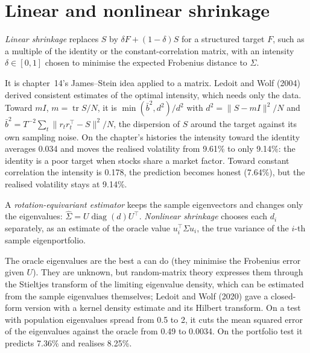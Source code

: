 \section{Linear and nonlinear shrinkage}

\begin{definition}\label{def:qm:covariance-estimation-and-random-matrices:linear}
\emph{Linear shrinkage} replaces $S$ by $\delta F + (1 - \delta)S$ for a structured target $F$, such as a multiple of the identity or the constant-correlation
matrix, with an intensity $\delta \in [0, 1]$ chosen to minimise the expected Frobenius distance to $\Sigma$.
\end{definition}

It is chapter~14's James--Stein idea applied to a matrix. Ledoit and Wolf (2004) derived consistent estimates of the optimal intensity, which needs only the data. Toward
$mI$, $m = \operatorname{tr}S/N$, it is $\min(\bar b^2, d^2)/d^2$ with $d^2 = \lVert S - mI\rVert^2/N$ and $\bar b^2 = T^{-2}\sum_t\lVert r_tr_t^\top - S\rVert^2/N$, the dispersion of $S$ around the
target against its own sampling noise. On the chapter's histories the intensity toward the identity averages 0.034 and moves the realised volatility from 9.61\% to only
9.14\%: the identity is a poor target when stocks share a market factor. Toward constant correlation the intensity is 0.178, the prediction becomes honest (7.64\%), but the
realised volatility stays at 9.14\%.

\begin{definition}\label{def:qm:covariance-estimation-and-random-matrices:nonlinear}
A \emph{rotation-equivariant estimator} keeps the sample eigenvectors and changes only the eigenvalues: $\hat\Sigma = U\operatorname{diag}(d)U^\top$.
\emph{Nonlinear shrinkage} chooses each $d_i$ separately, as an estimate of the oracle value $u_i^\top\Sigma u_i$, the true variance of the $i$-th
sample eigenportfolio.
\end{definition}

The oracle eigenvalues are the best a  can do (they minimise the Frobenius error given $U$). They are unknown, but random-matrix theory expresses
them through the Stieltjes transform of the limiting eigenvalue density, which can be estimated from the sample eigenvalues themselves; Ledoit and Wolf (2020) gave a closed-form
version with a kernel density estimate and its Hilbert transform. On a test with population eigenvalues spread from 0.5 to 2, it cuts the mean squared error of the eigenvalues
against the oracle from 0.49 to 0.0034. On the portfolio test it predicts 7.36\% and realises 8.25\%.

